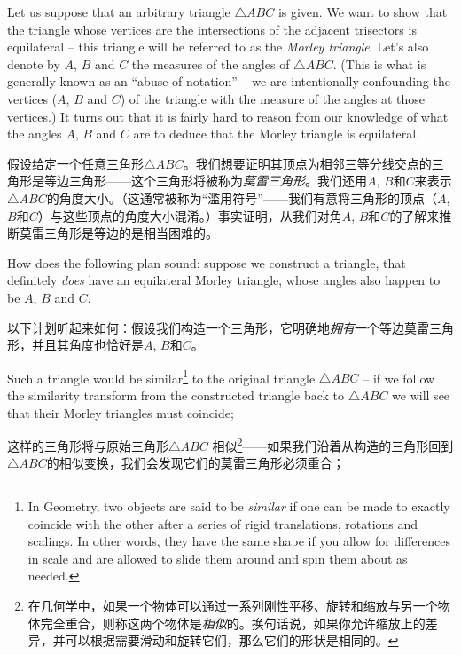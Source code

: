 Let us suppose that an arbitrary triangle ${\triangle}ABC$ is given.
We want to show that the triangle whose vertices are the intersections
of the adjacent trisectors is equilateral -- this triangle will be
referred to as the \emph{Morley triangle}.  
Let's also denote by
$A$, $B$ and $C$ the measures of the angles of ${\triangle}ABC$.  (This
is what is generally known as an ``abuse of notation'' -- we are intentionally
confounding the vertices ($A$, $B$ and $C$) of the triangle with the
measure of the angles at those vertices.)   It turns out that it is
fairly hard to reason from our knowledge of what the angles $A$, $B$ and $C$
are to deduce that the Morley triangle is equilateral.

假设给定一个任意三角形${\triangle}ABC$。我们想要证明其顶点为相邻三等分线交点的三角形是等边三角形——这个三角形将被称为\emph{莫雷三角形}。我们还用$A$, $B$和$C$来表示${\triangle}ABC$的角度大小。（这通常被称为“滥用符号”——我们有意将三角形的顶点（$A$, $B$和$C$）与这些顶点的角度大小混淆。）事实证明，从我们对角$A$, $B$和$C$的了解来推断莫雷三角形是等边的是相当困难的。

How does the
following plan sound: suppose we construct a triangle, that definitely
\emph{does} have an equilateral Morley triangle, whose angles also happen
to be $A$, $B$ and $C$.

以下计划听起来如何：假设我们构造一个三角形，它明确地\emph{拥有}一个等边莫雷三角形，并且其角度也恰好是$A$, $B$和$C$。

Such a triangle would be 
similar\footnote{In Geometry, two objects are said to be \emph{similar} %
if one can be made to exactly coincide with the other after a series of %
rigid translations, rotations and scalings. In other words, they have %
the same shape if you allow for differences in scale and are allowed to %
slide them around and spin them about as needed.} 
to the original
triangle ${\triangle}ABC$ -- if we follow the 
similarity transform from the
constructed triangle back to ${\triangle}ABC$ we will see that their 
Morley triangles must coincide;

这样的三角形将与原始三角形${\triangle}ABC$ 相似\footnote{在几何学中，如果一个物体可以通过一系列刚性平移、旋转和缩放与另一个物体完全重合，则称这两个物体是\emph{相似}的。换句话说，如果你允许缩放上的差异，并可以根据需要滑动和旋转它们，那么它们的形状是相同的。}——如果我们沿着从构造的三角形回到${\triangle}ABC$的相似变换，我们会发现它们的莫雷三角形必须重合；

